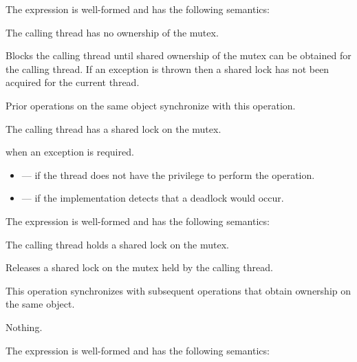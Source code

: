 \pnum
The expression  is well-formed and has the
following semantics:

\begin{itemdescr}
\pnum
\expects
The calling thread has no ownership of the mutex.

\pnum
{}%
\effects
Blocks the calling thread until shared ownership of the mutex can be obtained for the calling thread.
If an exception is thrown then a shared lock has not been acquired for the current thread.

\pnum
\sync
Prior  operations on the same object synchronize with this operation.

\pnum
\ensures
The calling thread has a shared lock on the mutex.

\pnum
\result
{}

\pnum
\throws
{} when an exception is required.

\pnum
\errors
\begin{itemize}
\item {} --- if the thread does not have the privilege to perform the operation.
\item {} --- if the implementation detects that a deadlock would occur.
\end{itemize}
\end{itemdescr}

\pnum
The expression  is well-formed and has the following semantics:

\begin{itemdescr}
\pnum
\expects
The calling thread holds a shared lock on the mutex.

\pnum
\effects
Releases a shared lock on the mutex held by the calling thread.

\pnum
\result
{}

\pnum
\sync
This operation synchronizes with subsequent
 operations that obtain ownership on the same object.

\pnum
\throws
Nothing.
\end{itemdescr}

\pnum
The expression  is well-formed and has the following semantics:

